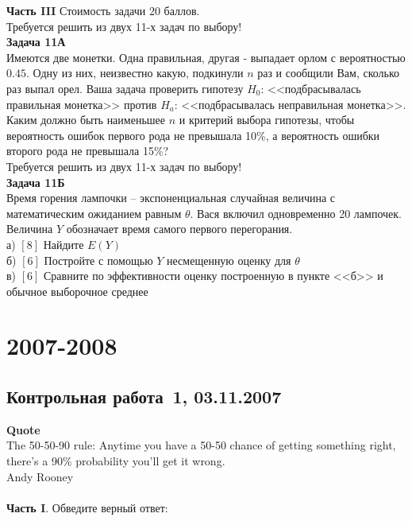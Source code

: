 \documentclass[pdftex,12pt,a4paper]{article}
\begin{document}
\textbf{Часть III} Стоимость задачи 20 баллов. \\

Требуется решить \textbf{} из двух 11-х задач по
выбору! \\


\textbf{Задача 11А} \\
Имеются две монетки. Одна правильная, другая - выпадает орлом с
вероятностью $0.45$. Одну из них, неизвестно какую, подкинули $n$
раз и сообщили Вам, сколько раз выпал орел. Ваша задача проверить
гипотезу $H_{0}$: <<подбрасывалась правильная монетка>> против
$H_{a}$:
<<подбрасывалась неправильная монетка>>. \\
Каким должно быть наименьшее $n$ и критерий выбора гипотезы, чтобы
вероятность ошибок первого рода не превышала 10\%, а вероятность
ошибки второго рода не превышала 15\%? \\

Требуется решить \textbf{} из двух 11-х задач по
выбору! \\

\textbf{Задача 11Б} \\
Время горения лампочки – экспоненциальная случайная величина с
математическим ожиданием равным $\theta $. Вася включил
одновременно 20 лампочек. Величина  $Y$ обозначает время самого
первого перегорания. \\
а) $[8]$ Найдите $E(Y)$ \\
б) $[6]$ Постройте с помощью  $Y$ несмещенную оценку для  $\theta$ \\
в) $[6]$ Сравните по эффективности оценку построенную в пункте
<<б>> и
обычное выборочное среднее \\


\section{2007-2008}
\subsection{Контрольная работа \No\,1, 03.11.2007}

\textbf{Quote}\\
The 50-50-90 rule: Anytime you have a 50-50 chance of getting something right, there's a 90\% probability you'll get it wrong. \\
Andy Rooney\\ \\

\textbf{Часть I}. Обведите верный ответ: \\
\end{document}
